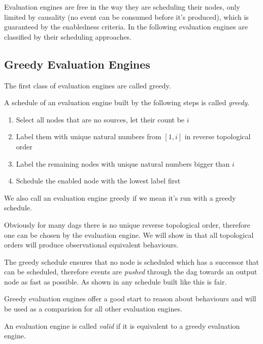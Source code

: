 Evaluation engines are free in the way they are scheduling their nodes, only limited by causality (no event can be consumed before it's produced), which is guaranteed by the enabledness criteria.
In the following evaluation engines are classified by their scheduling approaches.

\subsection{Greedy Evaluation Engines}
\label{sec:behaviours:without_timing:greedy}

The first class of evaluation engines are called greedy.

\begin{definition}[name = Greedy schedule]\label{def:greedy_schedule}
  A schedule of an evaluation engine built by the following steps is called \emph{greedy}.
  \begin{enumerate}
    \item Select all nodes that are no sources, let their count be \(i\)
    \item Label them with unique natural numbers from \([1,i]\) in reverse topological order
    \item Label the remaining nodes with unique natural numbers bigger than \(i\)
    \item Schedule the enabled node with the lowest label first
  \end{enumerate}

  We also call an evaluation engine greedy if we mean it's run with a greedy schedule.
\end{definition}

Obviously for many \glspl{dag} there is no unique reverse topological order, therefore one can be chosen by the evaluation engine.
We will show in  that all topological orders will produce observational equivalent behaviours.

The greedy schedule ensures that no node is scheduled which has a successor that can be scheduled, therefore events are \emph{pushed} through the \gls{dag} towards an output node as fast as possible.
As shown in  any schedule built like this is fair.

Greedy evaluation engines offer a good start to reason about behaviours and will be used as a comparision for all other evaluation engines.

\begin{definition}[name = Valid Evaluation Engines]\label{def:valid_eval_engine}
  An evaluation engine is called \emph{valid} if it is equivalent to a greedy evaluation engine.
\end{definition}



